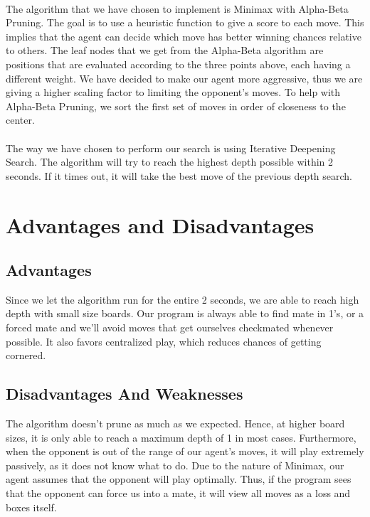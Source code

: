 \documentclass[12pt,a4paper]{article}
\begin{document}
\paragraph{} The algorithm that we have chosen to implement is Minimax with Alpha-Beta Pruning. 
The goal is to use a heuristic function to give a score to each move. This implies that the agent can 
decide which move has better winning chances relative to others. The leaf nodes that we get from the Alpha-Beta 
algorithm are positions that are evaluated according to the three points above, each having a different weight.
We have decided to make our agent more aggressive, thus we are giving a higher scaling factor to limiting the 
opponent's moves. To help with Alpha-Beta Pruning, we sort the first set of moves in order of closeness to the center.
\paragraph{} The way we have chosen to perform our search is using Iterative Deepening Search. The algorithm will try to reach the 
highest depth possible within 2 seconds. If it times out, it will take the best move of the previous depth search. 

\section{Advantages and Disadvantages}
\subsection{Advantages}
Since we let the algorithm run for the entire 2 seconds, we are able to reach high depth with small size boards. 
Our program is always able to find mate in 1's, or a forced mate and we'll avoid moves that get ourselves 
checkmated whenever possible. 
It also favors centralized play, which reduces chances of getting cornered. 
\subsection{Disadvantages And Weaknesses}
The algorithm doesn't prune as much as we expected. Hence, at higher board sizes, it is only able to reach a maximum 
depth of 1 in most cases. Furthermore, when the opponent is out of the range of our agent's moves, it will play extremely 
passively, as it does not know what to do. Due to the nature of Minimax, our agent assumes that the opponent will play 
optimally. Thus, if the program sees that the opponent can force us into a mate, it will view all 
moves as a loss and boxes itself. 
\end{document}

